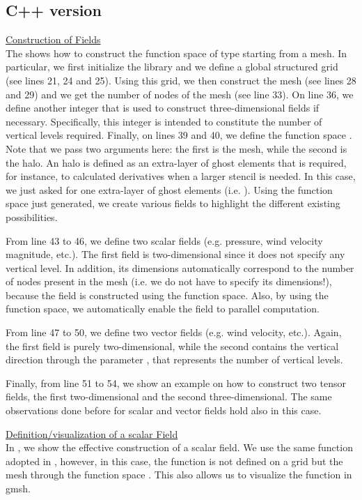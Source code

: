 \subsection{C++ version}
%
\begin{description}
%
\item \underline{Construction of Fields}\\[0.5em]
%
The  shows how to construct the function space 
 of type  starting from a mesh.
In particular, we first initialize 
the \Atlas library and we define a global structured grid (see lines 
21, 24 and 25). Using this grid, we then construct the mesh (see 
lines 28 and 29) and we get the number of nodes of the mesh (see line 
33). On line 36, we define another integer that is used to construct 
three-dimensional fields if necessary. Specifically, this integer 
is intended to constitute the number of vertical levels required. 
Finally, on lines 39 and 40, we define the function space .
Note that we pass two arguments here: the first is the mesh, while the 
second is the halo. An halo is defined as an extra-layer of ghost elements
that is required, for instance, to calculated derivatives when a larger 
stencil is needed. In this case, we just asked for one extra-layer of 
ghost elements (i.e. ). 
Using the function space  just generated, we create 
various fields to highlight the different existing possibilities.

From line 43 to 46, we define two scalar fields (e.g. pressure, 
wind velocity magnitude, etc.). The first field is two-dimensional 
since it does not specify any vertical level. In addition, its 
dimensions automatically correspond to the number of nodes present 
in the mesh (i.e. we do not have to specify its dimensions!), because 
the field is constructed using the function space. Also, by using the 
function space, we automatically enable the field to parallel computation.

From line 47 to 50, we define two vector fields (e.g. wind velocity, etc.).
Again, the first field is purely two-dimensional, while the second contains 
the vertical direction through the parameter , that represents
the number of vertical levels. 

Finally, from line 51 to 54, we show an example on how to construct 
two tensor fields, the first two-dimensional and the second three-dimensional.
The same observations done before for scalar and vector fields hold 
also in this case.
%

%
%
\item \underline{Definition/visualization of a scalar Field}\\[0.5em]
%
%
In , we show the effective construction 
of a scalar field. We use the same function adopted in , 
however, in this case, the function is not defined on a grid but 
the mesh through the function space . This also allows 
us to visualize the function in gmsh.


\end{description}

